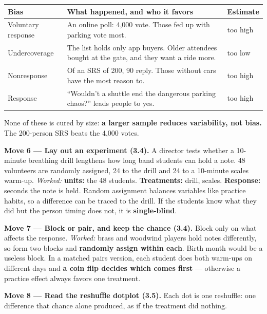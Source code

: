 \documentclass[12pt]{article}
\begin{document}
\vspace{2pt}
\noindent\begin{tabularx}{\linewidth}{@{} l X l @{}}
\rowcolor{sky}
\textbf{Bias} & \textbf{What happened, and who it favors} & \textbf{Estimate} \\
\midrule
Voluntary response & An online poll: 4{,}000 vote. Those fed up with parking vote most. & too high \\
Undercoverage & The list holds only app buyers. Older attendees bought at the gate, and they
                want a ride more. & too low \\
Nonresponse & Of an SRS of 200, 90 reply. Those without cars have the most reason to. & too high \\
Response & ``Wouldn't a shuttle end the dangerous parking chaos?'' leads people to yes. & too high \\
\end{tabularx}

\vspace{3pt}
None of these is cured by size: \textbf{a larger sample reduces variability, not bias.} The
200-person SRS beats the 4{,}000 votes.

\vspace{3pt}
\textbf{Move 6 --- Lay out an experiment (3.4).} A director tests whether a 10-minute breathing
drill lengthens how long band students can hold a note. 48 volunteers are randomly assigned, 24
to the drill and 24 to a 10-minute scales warm-up. \emph{Worked:} \textbf{units:} the 48
students. \textbf{Treatments:} drill, scales. \textbf{Response:} seconds the note is held.
Random assignment balances variables like practice habits, so a difference can be traced to the
drill. If the students know what they did but the person timing does not, it is
\textbf{single-blind}.

\vspace{3pt}
\textbf{Move 7 --- Block or pair, and keep the chance (3.4).} Block only on what affects the
response. \emph{Worked:} brass and woodwind players hold notes differently, so form two blocks and
\textbf{randomly assign within each}. Birth month would be a useless block. In a matched pairs
version, each student does both warm-ups on different days and \textbf{a coin flip decides which
comes first} --- otherwise a practice effect always favors one treatment.

\vspace{3pt}
\boxguard[14]
\textbf{Move 8 --- Read the reshuffle dotplot (3.5).} Each dot is one reshuffle: one difference
that chance alone produced, as if the treatment did nothing.
\end{document}
